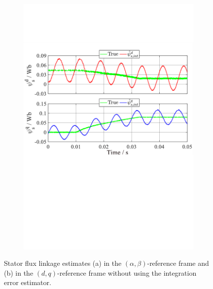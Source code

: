 \begin{figure}[h]
\begin{subfigure}[b]{0.80\textwidth}
        \includegraphics[scale=0.57]{chapters/Fig4.4b.pdf}
        \caption{}
        \label{Fig:4.4b}
    \end{subfigure}
    \caption{Stator flux linkage estimates (a) in the $(\alpha,\beta)$-reference frame and (b) in the $(d,q)$-reference frame without using the integration error estimator.}
    \label{Fig:4.4}
\end{figure}

